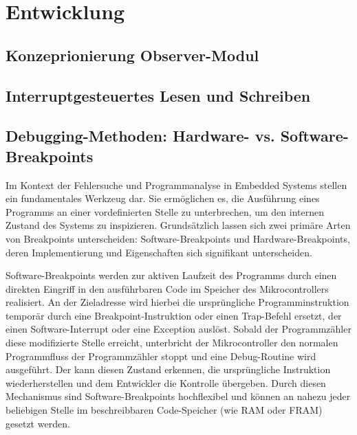 
\chapter{Entwicklung}

\section{Konzeprionierung Observer-Modul}
\label{Grundger\"ust_ObserverModul}


\newpage
\section{Interruptgesteuertes Lesen und Schreiben}
\label{Interruptgesteuertes_Lesen&Schreiben}


\newpage
\section{Debugging-Methoden: Hardware- vs. Software-Breakpoints}
\label{Hardware_VS_Software_Breakpoints}

Im Kontext der Fehlersuche und Programmanalyse in Embedded Systems stellen  ein fundamentales Werkzeug dar. Sie erm\"oglichen es, die Ausf\"uhrung eines Programms an einer vordefinierten Stelle zu unterbrechen, um den internen Zustand des Systems zu inspizieren. Grunds\"atzlich lassen sich zwei prim\"are Arten von Breakpoints unterscheiden: Software-Breakpoints und Hardware-Breakpoints, deren Implementierung und Eigenschaften sich signifikant unterscheiden.

Software-Breakpoints werden zur aktiven Laufzeit des Programms durch einen direkten Eingriff in den ausf\"uhrbaren Code im Speicher des Mikrocontrollers realisiert. An der Zieladresse wird hierbei die urspr\"ungliche Programminstruktion tempor\"ar durch eine Breakpoint-Instruktion oder einen Trap-Befehl ersetzt, der einen Software-Interrupt oder eine Exception ausl\"ost. Sobald der Programmz\"ahler diese modifizierte Stelle erreicht, unterbricht der Mikrocontroller den normalen Programmfluss der Programmzähler stoppt und eine Debug-Routine wird ausgeführt. Der  kann diesen Zustand erkennen, die urspr\"ungliche Instruktion wiederherstellen und dem Entwickler die Kontrolle \"ubergeben. Durch diesen Mechanismus sind Software-Breakpoints hochflexibel und k\"onnen an nahezu jeder beliebigen Stelle im beschreibbaren Code-Speicher (wie RAM oder FRAM) gesetzt werden.

